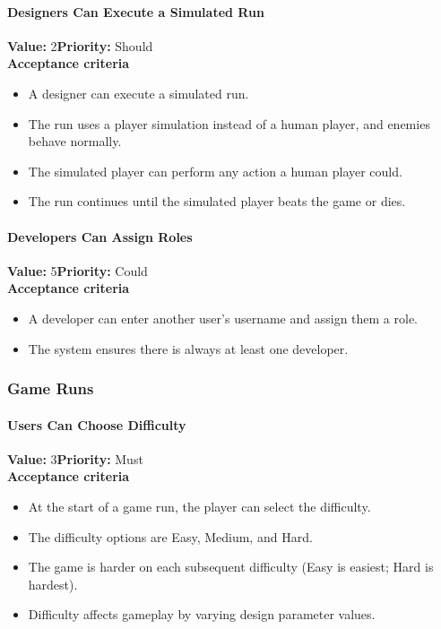 \paragraph{Designers Can Execute a Simulated Run}
\textbf{Value:} 2\quad \textbf{Priority:} Should\\
\textbf{Acceptance criteria}
\begin{itemize}
  \item A designer can execute a simulated run.
  \item The run uses a player simulation instead of a human player, and enemies behave normally.
  \item The simulated player can perform any action a human player could.
  \item The run continues until the simulated player beats the game or dies.
\end{itemize}

\paragraph{Developers Can Assign Roles}
\textbf{Value:} 5\quad \textbf{Priority:} Could\\
\textbf{Acceptance criteria}
\begin{itemize}
  \item A developer can enter another user's username and assign them a role.
  \item The system ensures there is always at least one developer.
\end{itemize}

\subsubsection{Game Runs}

\paragraph{Users Can Choose Difficulty}
\textbf{Value:} 3\quad \textbf{Priority:} Must\\
\textbf{Acceptance criteria}
\begin{itemize}
  \item At the start of a game run, the player can select the difficulty.
  \item The difficulty options are Easy, Medium, and Hard.
  \item The game is harder on each subsequent difficulty (Easy is easiest; Hard is hardest).
  \item Difficulty affects gameplay by varying design parameter values.
\end{itemize}

